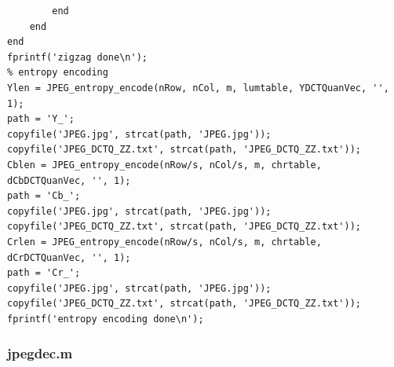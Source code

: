 \documentclass[12pt]{article}
\begin{document}
\begin{verbatim}
        end
    end
end
fprintf('zigzag done\n');
% entropy encoding
Ylen = JPEG_entropy_encode(nRow, nCol, m, lumtable, YDCTQuanVec, '', 1);
path = 'Y_';
copyfile('JPEG.jpg', strcat(path, 'JPEG.jpg'));
copyfile('JPEG_DCTQ_ZZ.txt', strcat(path, 'JPEG_DCTQ_ZZ.txt'));
Cblen = JPEG_entropy_encode(nRow/s, nCol/s, m, chrtable, dCbDCTQuanVec, '', 1);
path = 'Cb_';
copyfile('JPEG.jpg', strcat(path, 'JPEG.jpg'));
copyfile('JPEG_DCTQ_ZZ.txt', strcat(path, 'JPEG_DCTQ_ZZ.txt'));
Crlen = JPEG_entropy_encode(nRow/s, nCol/s, m, chrtable, dCrDCTQuanVec, '', 1);
path = 'Cr_';
copyfile('JPEG.jpg', strcat(path, 'JPEG.jpg'));
copyfile('JPEG_DCTQ_ZZ.txt', strcat(path, 'JPEG_DCTQ_ZZ.txt'));
fprintf('entropy encoding done\n');
\end{verbatim}

\subsubsection{jpegdec.m}
\end{document}
